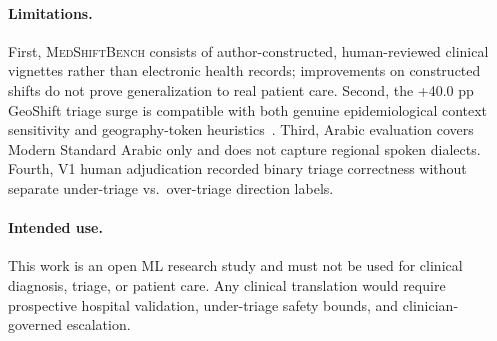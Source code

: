 \documentclass[10pt,twocolumn]{article}
\begin{document}
\paragraph{Limitations.}
First, \textsc{MedShiftBench} consists of author-constructed, human-reviewed clinical vignettes rather than electronic health records; improvements on constructed shifts do not prove generalization to real patient care. Second, the +40.0 pp GeoShift triage surge is compatible with both genuine epidemiological context sensitivity and geography-token heuristics~\cite{geirhos2020shortcut}. Third, Arabic evaluation covers Modern Standard Arabic only and does not capture regional spoken dialects. Fourth, V1 human adjudication recorded binary triage correctness without separate under-triage vs.\ over-triage direction labels.

\paragraph{Intended use.}
This work is an open ML research study and must not be used for clinical diagnosis, triage, or patient care. Any clinical translation would require prospective hospital validation, under-triage safety bounds, and clinician-governed escalation.

{\footnotesize


}
\end{document}
